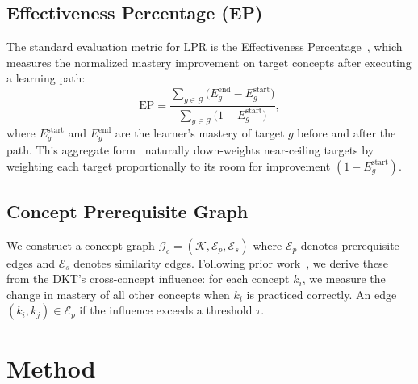 \documentclass[sigconf,anonymous]{acmart}
\newcommand{\ep}{\mathrm{EP}}
\begin{document}
\subsection{Effectiveness Percentage (EP)}

The standard evaluation metric for LPR is the Effectiveness Percentage~\cite{liu2019cseal,cheng2025knowlp}, which measures the normalized mastery improvement on target concepts after executing a learning path:
\begin{equation}
    \ep = \frac{\sum_{g \in \mathcal{G}} \bigl(E_g^{\text{end}} - E_g^{\text{start}}\bigr)}{\sum_{g \in \mathcal{G}} \bigl(1 - E_g^{\text{start}}\bigr)},
    \label{eq:ep}
\end{equation}
where $E_g^{\text{start}}$ and $E_g^{\text{end}}$ are the learner's mastery of target $g$ before and after the path. This aggregate form~\cite{cheng2025knowlp} naturally down-weights near-ceiling targets by weighting each target proportionally to its room for improvement $(1 - E_g^{\text{start}})$.

\subsection{Concept Prerequisite Graph}

We construct a concept graph $\mathcal{G}_c = (\mathcal{K}, \mathcal{E}_p, \mathcal{E}_s)$ where $\mathcal{E}_p$ denotes prerequisite edges and $\mathcal{E}_s$ denotes similarity edges. Following prior work~\cite{liu2019cseal,cheng2025knowlp}, we derive these from the DKT's cross-concept influence: for each concept $k_i$, we measure the change in mastery of all other concepts when $k_i$ is practiced correctly. An edge $(k_i, k_j) \in \mathcal{E}_p$ if the influence exceeds a threshold $\tau$.

\section{Method}
\end{document}
